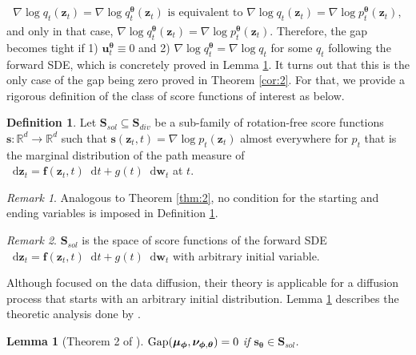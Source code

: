 \documentclass{article}
\newtheorem{lemma}{Lemma}
\theoremstyle{definition}
\newtheorem{definition}{Definition}
\theoremstyle{remark}
\newtheorem{remark}{Remark}
\newcommand*\diff{\mathop{}\!\mathrm{d}}
\begin{document}
	\begin{align*}
	\nabla\log{q_{t}(\mathbf{z}_{t})}=\nabla\log{q_{t}^{\bm{\theta}}(\mathbf{z}_{t})}\text{ is equivalent to }\nabla\log{q_{t}(\mathbf{z}_{t})}=\nabla\log{p_{t}^{\bm{\theta}}(\mathbf{z}_{t})},
	\end{align*}
	and only in that case,  $\nabla\log{q_{t}^{\bm{\theta}}(\mathbf{z}_{t})}=\nabla\log{p_{t}^{\bm{\theta}}(\mathbf{z}_{t})}$. Therefore, the gap becomes tight if 1) $\mathbf{u}_{t}^{\bm{\theta}}\equiv 0$ and 2) $\nabla\log{q_{t}^{\bm{\theta}}}=\nabla\log{q_{t}}$ for some $q_{t}$ following the forward SDE, which is concretely proved in Lemma \ref{lemma:2}. It turns out that this is the only case of the gap being zero proved in Theorem \ref{cor:2}. For that, we provide a rigorous definition of the class of score functions of interest as below. 
	\begin{definition}\label{def:1}
		Let $\mathbf{S}_{sol}\subseteq\mathbf{S}_{div}$ be a sub-family of rotation-free score functions $\mathbf{s}:\mathbb{R}^{d}\rightarrow\mathbb{R}^{d}$ such that $\mathbf{s}(\mathbf{z}_{t},t)=\nabla\log{p_{t}(\mathbf{z}_{t})}$ almost everywhere for $p_{t}$ that is the marginal distribution of the path measure of $\diff\mathbf{z}_{t}=\mathbf{f}(\mathbf{z}_{t},t)\diff t+g(t)\diff\mathbf{w}_{t}$ at $t$.
	\end{definition}
	\begin{remark}
		Analogous to Theorem \ref{thm:2}, no condition for the starting and ending variables is imposed in Definition \ref{def:1}.
	\end{remark}
	\begin{remark}
		$\mathbf{S}_{sol}$ is the space of score functions of the forward SDE $\diff\mathbf{z}_{t}=\mathbf{f}(\mathbf{z}_{t},t)\diff t+g(t)\diff\mathbf{w}_{t}$ with arbitrary initial variable.
	\end{remark}
	
	Although \citet{song2021maximum} focused on the data diffusion, their theory is applicable for a diffusion process that starts with an arbitrary initial distribution. Lemma \ref{lemma:2} describes the theoretic analysis done by \citet{song2021maximum}.
	\begin{lemma}[Theorem 2 of \citet{song2021maximum}]\label{lemma:2}
		$\textup{Gap}(\bm{\mu}_{\bm{\phi}},\bm{\nu}_{\bm{\phi},\bm{\theta}})=0$ if $\mathbf{s}_{\bm{\theta}}\in\mathbf{S}_{sol}$.
	\end{lemma}
	
\end{document}
